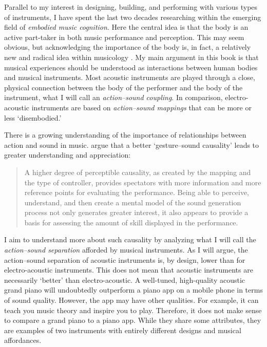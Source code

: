 Parallel to my interest in designing, building, and performing with various types of instruments, I have spent the last two decades researching within the emerging field of \emph{embodied music cognition}. Here the central idea is that the body is an active part-taker in both music performance and perception. This may seem obvious, but acknowledging the importance of the body is, in fact, a relatively new and radical idea within musicology \citep{clarke_ways_2005,leman_embodied_2008}. My main argument in this book is that musical experiences should be understood as interactions between human bodies and musical instruments. Most acoustic instruments are played through a close, physical connection between the body of the performer and the body of the instrument, what I will call an \emph{action--sound coupling}. In comparison, electro-acoustic instruments are based on \emph{action--sound mappings} that can be more or less `disembodied.'

There is a growing understanding of the importance of relationships between action and sound in music. \citet{emerson_gesture-sound_2018} argue that a better `gesture--sound causality' leads to greater understanding and appreciation:

\begin{quotation}
A higher degree of perceptible causality, as created by the mapping and the type of controller, provides spectators with more information and more reference points for evaluating the performance. Being able to perceive, understand, and then create a mental model of the sound generation process not only generates greater interest, it also appears to provide a basis for assessing the amount of skill displayed in the performance.
\end{quotation}

I aim to understand more about such causality by analyzing what I will call the \emph{action--sound separation} afforded by musical instruments. As I will argue, the action--sound separation of acoustic instruments is, by design, lower than for electro-acoustic instruments. This does not mean that acoustic instruments are necessarily `better' than electro-acoustic. A well-tuned, high-quality acoustic grand piano will undoubtedly outperform a piano app on a mobile phone in terms of sound quality. However, the app may have other qualities. For example, it can teach you music theory and inspire you to play. Therefore, it does not make sense to compare a grand piano to a piano app. While they share some attributes, they are examples of two instruments with entirely different designs and musical affordances.


